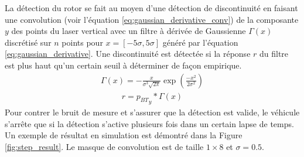 La détection du rotor se fait au moyen d'une détection de discontinuité en faisant une convolution (voir l'équation \ref{eq:gaussian_derivative_conv}) de la composante $y$ des points du laser vertical avec un filtre à dérivée de Gaussienne $\Gamma(x)$ discrétisé sur $n$ points pour $x=[-5\sigma,5\sigma]$ généré par l'équation \ref{eq:gaussian_derivative}. Une discontinuité est détectée si la réponse $r$ du filtre est plus haut qu'un certain seuil à déterminer de façon empirique.
\begin{align}
  \Gamma(x) = - \frac{x}{\sigma^3 \sqrt{2\pi}} \exp\left(\frac{-x^2}{2 \sigma^2}\right)
  \label{eq:gaussian_derivative}
\end{align}
\begin{align}
  r = {p_{BT}}_y * \Gamma(x)
  \label{eq:gaussian_derivative_conv}
\end{align}
Pour contrer le bruit de mesure et s'assurer que la détection est valide, le véhicule s'arrête que si la détection s'active plusieurs fois dans un certain lapse de temps. Un exemple de résultat en simulation est démontré dans la Figure \ref{fig:step_result}. Le masque de convolution est de taille $1\times8$ et $\sigma = 0.5$.

